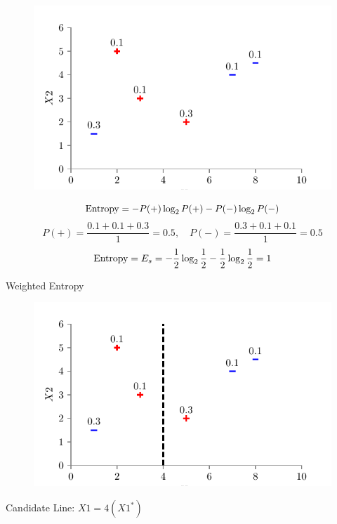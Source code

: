 \documentclass[usenames,dvipsnames]{beamer}
\begin{document}
\begin{frame}
\begin{figure}
    \centering
    \includegraphics{../assets/decision-trees/figures/dt_weighted/fig2.pdf}
\end{figure}
\small
$$\operatorname{Entropy} = -P(+) \log_2 P(+) - P(-) \log_2 P(-)$$
$$P(+) = \frac{0.1 + 0.1 + 0.3}{1} = 0.5, \quad P(-) = \frac{0.3 + 0.1 + 0.1}{1} = 0.5$$
$$\operatorname{Entropy} = E_s = -\frac{1}{2} \log_2 \frac{1}{2} - \frac{1}{2} \log_2 \frac{1}{2} = 1$$
\end{frame}
	
\begin{frame}{Weighted Entropy}
\begin{figure}
    \centering
    \includegraphics{../assets/decision-trees/figures/dt_weighted/fig3.pdf}
\end{figure}
Candidate Line: \(X1 = 4 (X1^*)\)
\end{frame}
		
\end{document}
